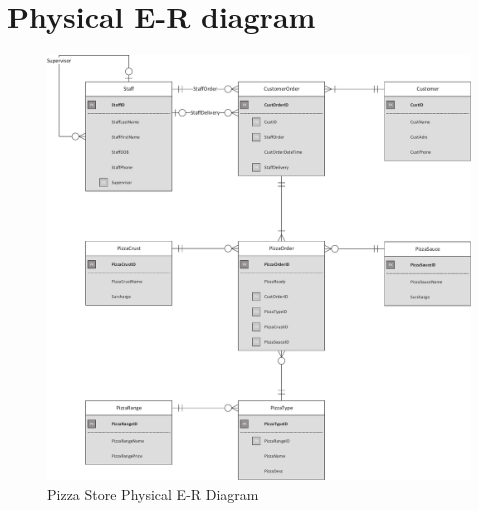 \newpage
\section{Physical E-R diagram}

\begin{figure}[H]
\centering
\caption{Pizza Store Physical E-R Diagram}
\includegraphics[scale=0.45]{./img/CSG1207_A1_PONCE_TASK_4_ADVPER_PIZZA.pdf}
\end{figure}